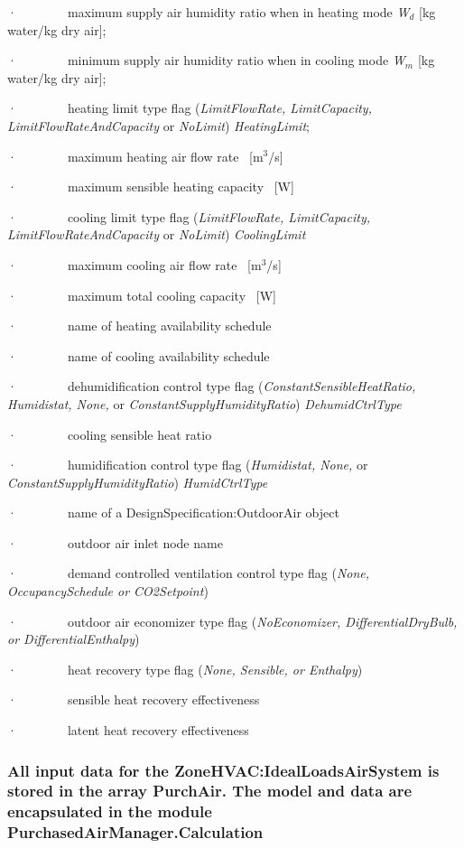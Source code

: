 ·~~~~~~~~maximum supply air humidity ratio when in heating mode \emph{W\(_{d}\)} {[}kg water/kg dry air{]};

·~~~~~~~~minimum supply air humidity ratio when in cooling mode \emph{W\(_{m}\)} {[}kg water/kg dry air{]};

·~~~~~~~~heating limit type flag (\emph{LimitFlowRate, LimitCapacity, LimitFlowRateAndCapacity} or \emph{NoLimit}) \emph{HeatingLimit};

·~~~~~~~~maximum heating air flow rate~ {[}m\(^{3}\)/s{]}

·~~~~~~~~maximum sensible heating capacity~ {[}W{]}

·~~~~~~~~cooling limit type flag (\emph{LimitFlowRate, LimitCapacity, LimitFlowRateAndCapacity} or \emph{NoLimit}) \emph{CoolingLimit}

·~~~~~~~~maximum cooling air flow rate~ {[}m\(^{3}\)/s{]}

·~~~~~~~~maximum total cooling capacity~ {[}W{]}

·~~~~~~~~name of heating availability schedule

·~~~~~~~~name of cooling availability schedule

·~~~~~~~~dehumidification control type flag (\emph{ConstantSensibleHeatRatio, Humidistat, None,} or \emph{ConstantSupplyHumidityRatio}) \emph{DehumidCtrlType}

·~~~~~~~~cooling sensible heat ratio

·~~~~~~~~humidification control type flag (\emph{Humidistat, None,} or \emph{ConstantSupplyHumidityRatio}) \emph{HumidCtrlType}

·~~~~~~~~name of a DesignSpecification:OutdoorAir object

·~~~~~~~~outdoor air inlet node name

·~~~~~~~~demand controlled ventilation control type flag (\emph{None, OccupancySchedule or CO2Setpoint})

·~~~~~~~~outdoor air economizer type flag (\emph{NoEconomizer, DifferentialDryBulb, or DifferentialEnthalpy})

·~~~~~~~~heat recovery type flag (\emph{None, Sensible, or Enthalpy})

·~~~~~~~~sensible heat recovery effectiveness

·~~~~~~~~latent heat recovery effectiveness

\subsubsection{All input data for the ZoneHVAC:IdealLoadsAirSystem is stored in the array PurchAir. The model and data are encapsulated in the module PurchasedAirManager.Calculation}\label{all-input-data-for-the-zonehvacidealloadsairsystem-is-stored-in-the-array-purchair.-the-model-and-data-are-encapsulated-in-the-module-purchasedairmanager.calculation}

